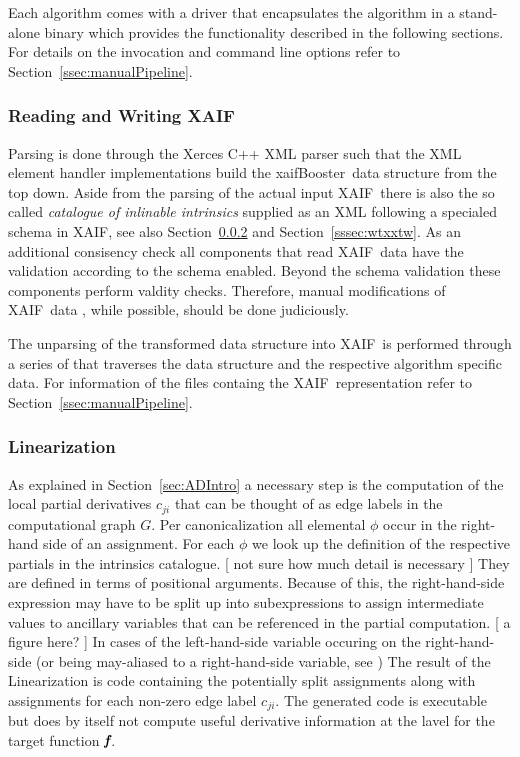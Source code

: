 \documentclass[acmtocl,acmnow]{acmtrans2m}
\newcommand{\xaif}{XAIF}
\newcommand{\xaifBooster}{xaifBooster}
\newcommand{\bmf}{\mbox{\bf\em f}}
\newcommand{\refsec}[1]{Section~\ref{#1}}
\begin{document}
Each algorithm comes with a driver that encapsulates the algorithm 
in a stand-alone binary which provides the functionality described in the following 
sections. For details on the invocation and command line options refer to 
\refsec{ssec:manualPipeline}.
 
\subsubsection{Reading and Writing \xaif}
Parsing is done through the Xerces C++ XML parser \cite{xercesWeb}
such that the XML element handler implementations build the \xaifBooster\ data 
structure 
from the top down. 
Aside from the parsing of the actual input \xaif\ there is also the so called 
{\em 
catalogue of inlinable intrinsics
} 
supplied as an XML following a specialed schema in \xaif, see also 
\refsec{sssec:linearization} and \refsec{sssec:wtxxtw}.
As an additional consisency check all components that read \xaif\ data 
have the validation according to the schema enabled. Beyond the schema 
validation these components perform valdity checks. Therefore, 
manual modifications of \xaif\ data , while possible, should 
be done judiciously. 

The unparsing of the transformed data structure into \xaif\ is performed 
through a series of that traverses the data structure and the 
respective algorithm specific data. 
For information of the files containg the \xaif\ representation refer to 
\refsec{ssec:manualPipeline}.

\subsubsection{Linearization}\label{sssec:linearization}

As explained in \refsec{sec:ADIntro} a necessary step is the computation of 
the local partial derivatives $c_{ji}$ that can be thought of as edge labels 
in the computational graph $G$. Per canonicalization all elemental $\phi$ 
occur in the right-hand side of an assignment. 
For each $\phi$ we look up the definition of the respective partials in 
the intrinsics catalogue. 
{\color{Red} [ not sure  how much detail is necessary ] } 
They are defined in terms of positional arguments. Because of this, 
the right-hand-side expression may have to be split up into 
subexpressions to assign intermediate values to ancillary variables 
that can be referenced in the partial computation.  
{\color{Red} [ a figure here? ] }
In cases of the left-hand-side variable occuring on the right-hand-side (or being 
may-aliased to a right-hand-side variable, see )
The result of the Linearization is code containing the potentially split 
assignments along with assignments for each non-zero edge label $c_{ji}$.
The generated code is executable but does by itself not compute useful 
derivative information at the lavel for the target function $\bmf$.
 
\end{document}
